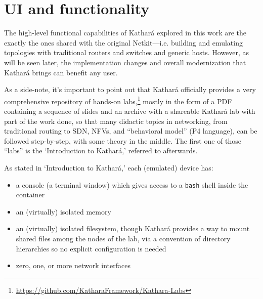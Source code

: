 \section{UI and functionality}
\label{sec:katharafunctionality}


The high-level functional capabilities of Kathará explored in this work are the exactly the ones shared with the original Netkit---i.e. building and emulating topologies with traditional routers and switches and generic hosts.
However, as will be seen later, the implementation changes and overall modernization that Kathará brings can benefit any user.

As a side-note, it's important to point out that Kathará officially provides a very comprehensive repository of hands-on labs,\footnote{\mbox{\url{https://github.com/KatharaFramework/Kathara-Labs}}} mostly in the form of a PDF containing a sequence of slides and an archive with a shareable Kathará lab with part of the work done, so that many didactic topics in networking, from traditional routing to SDN, NFVs, and ``behavioral model'' (P4 language), can be followed step-by-step, with some theory in the middle.
The first one of those ``labs'' is the `Introduction to Kathará,' referred to afterwards.



As stated in `Introduction to Kathará,' each (emulated) device has:
\begin{itemize}
  \item a console (a terminal window) which gives access to a \texttt{bash} shell inside the container
  \item an (virtually) isolated memory
  \item an (virtually) isolated filesystem, though Kathará provides a way to mount shared files among the nodes of the lab, via a convention of directory hierarchies so no explicit configuration is needed
  \item zero, one, or more network interfaces
\end{itemize}

